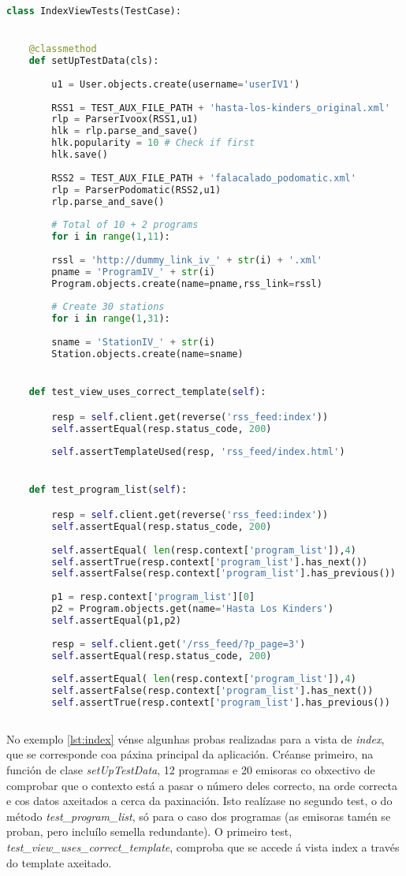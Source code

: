 \begin{lstlisting}[language=Python, caption=Fragmento das probas da vista index, label=lst:index]
class IndexViewTests(TestCase):


	@classmethod
	def setUpTestData(cls):
	
		u1 = User.objects.create(username='userIV1')
		
		RSS1 = TEST_AUX_FILE_PATH + 'hasta-los-kinders_original.xml'
		rlp = ParserIvoox(RSS1,u1)
		hlk = rlp.parse_and_save()
		hlk.popularity = 10 # Check if first
		hlk.save()
		
		RSS2 = TEST_AUX_FILE_PATH + 'falacalado_podomatic.xml'
		rlp = ParserPodomatic(RSS2,u1)
		rlp.parse_and_save()
		
		# Total of 10 + 2 programs
		for i in range(1,11):
		
		rssl = 'http://dummy_link_iv_' + str(i) + '.xml'
		pname = 'ProgramIV_' + str(i)
		Program.objects.create(name=pname,rss_link=rssl)
		
		# Create 30 stations
		for i in range(1,31):
		
		sname = 'StationIV_' + str(i)
		Station.objects.create(name=sname)


    def test_view_uses_correct_template(self):

		resp = self.client.get(reverse('rss_feed:index'))
		self.assertEqual(resp.status_code, 200)
		
		self.assertTemplateUsed(resp, 'rss_feed/index.html')


	def test_program_list(self):

		resp = self.client.get(reverse('rss_feed:index'))
		self.assertEqual(resp.status_code, 200)
		
		self.assertEqual( len(resp.context['program_list']),4)
		self.assertTrue(resp.context['program_list'].has_next())
		self.assertFalse(resp.context['program_list'].has_previous())
		
		p1 = resp.context['program_list'][0]
		p2 = Program.objects.get(name='Hasta Los Kinders')
		self.assertEqual(p1,p2)
		
		resp = self.client.get('/rss_feed/?p_page=3')
		self.assertEqual(resp.status_code, 200)
		
		self.assertEqual( len(resp.context['program_list']),4)
		self.assertFalse(resp.context['program_list'].has_next())
		self.assertTrue(resp.context['program_list'].has_previous())
	
\end{lstlisting}


No exemplo \ref{lst:index} vénse algunhas probas realizadas para a vista de \textit{index}, que se corresponde coa páxina principal da aplicación. Créanse primeiro, na función de clase \textit{setUpTestData}, 12 programas e 20 emisoras co obxectivo de comprobar que o contexto está a pasar o número deles correcto, na orde correcta e cos datos axeitados a cerca da paxinación. Isto realízase no segundo test, o do método \textit{test\_program\_list}, só para o caso dos programas (as emisoras tamén se proban, pero incluílo semella redundante). O primeiro test, \textit{test\_view\_uses\_correct\_template}, comproba que se accede á vista index a través do template axeitado.

